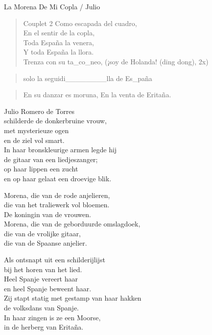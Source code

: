 \begin{song}{La Morena De Mi Copla / Julio}
\clearpage
\begin{verse}{Couplet 2}
Como escapada del cuadro,\\
En el sentir de la copla,\\
Toda España la venera,\chord{}\\
Y toda España la llora.\\
Trenza con su ta\_co\_neo, (¡soy de Holanda! \small{(ding dong)}, 2x)
\end{verse}

\begin{verse}{solo}
la seguidi\_\_\_\_\_\_\_\_lla de Es\_paña
\end{verse}

\begin{verse}{}
En su danzar es moruna,\hspace{4em}
En la venta de Eritaña.\\

\end{verse}
\end{song}


\begin{translation}
Julio Romero de Torres\\
schilderde de donkerbruine vrouw,\\
met mysterieuze ogen\\
en de ziel vol smart.\\
In haar bronskleurige armen legde hij\\
de gitaar van een liedjeszanger;\\
op haar lippen een zucht\\
en op haar gelaat een droevige blik.\vspace{\wlskip}

Morena, die van de rode anjelieren,\\
die van het traliewerk vol bloemen.\\
De koningin van de vrouwen.\\
Morena, die van de geborduurde omslagdoek,\\
die van de vrolijke gitaar,\\
die van de Spaanse anjelier.\vspace{\wlskip}

Als ontsnapt uit een schilderijlijst\\
bij het horen van het lied.\\
Heel Spanje vereert haar\\
en heel Spanje beweent haar.\\
Zij stapt statig met gestamp van haar hakken\\
de volksdans van Spanje.\\
In haar zingen is ze een Moorse,\\
in de herberg van Eritaña.
\end{translation}
